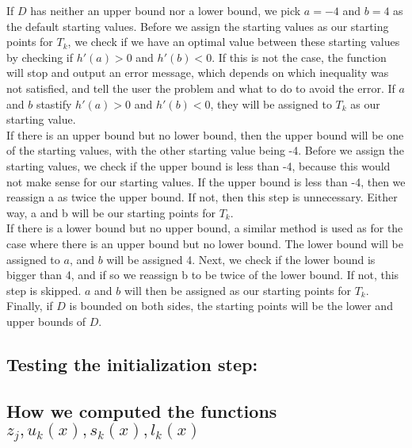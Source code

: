 \documentclass[12pt]{article}\usepackage[]{graphicx}\usepackage[]{color}
\begin{document}
If $D$ has neither an upper bound nor a lower bound, we pick $a = -4$ and $b = 4$ as the default starting values.  Before we assign the starting values as our starting points for $T_k$, we check if we have an optimal value between these starting values by checking if $h'(a) > 0$ and $h'(b) < 0$.  If this is not the case, the function will stop and output an error message, which depends on which inequality was not satisfied, and tell the user the problem and what to do to avoid the error.  If $a$ and $b$ stastify $h'(a) > 0$ and $h'(b) < 0$, they will be assigned to $T_k$ as our starting value.\\

If there is an upper bound but no lower bound, then the upper bound will be one of the starting values, with the other starting value being -4.  Before we assign the starting values, we check if the upper bound is less than -4, because this would not make sense for our starting values.  If the upper bound is less than -4, then we reassign a as twice the upper bound.  If not, then this step is unnecessary.  Either way, a and b will be our starting points for $T_k$.\\

If there is a lower bound but no upper bound, a similar method is used as for the case where there is an upper bound but no lower bound.  The lower bound will be assigned to $a$, and $b$ will be assigned 4.  Next, we check if the lower bound is bigger than 4, and if so we reassign b to be twice of the lower bound. If not, this step is skipped.  $a$ and $b$ will then be assigned as our starting points for $T_k$.\\

Finally, if $D$ is bounded on both sides, the starting points will be the lower and upper bounds of $D$.

\subsection*{Testing the initialization step:}


\subsection*{How we computed the functions $z_j, u_k(x), s_k(x), l_k(x)$}
\end{document}
